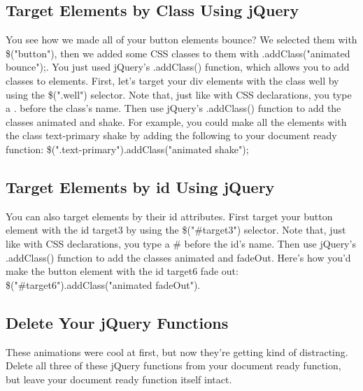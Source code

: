 \documentclass{article}%
\begin{document}
%
\subsection{Target Elements by Class Using jQuery}%
\label{subsec:TargetElementsbyClassUsingjQuery}%
You see how we made all of your button elements bounce? We selected them with \$("button"), then we added some CSS classes to them with .addClass("animated bounce");.\newline%
You just used jQuery's .addClass() function, which allows you to add classes to elements.\newline%
First, let's target your div elements with the class well by using the \$(".well") selector.\newline%
Note that, just like with CSS declarations, you type a . before the class's name.\newline%
Then use jQuery's .addClass() function to add the classes animated and shake.\newline%
For example, you could make all the elements with the class text{-}primary shake by adding the following to your document ready function:\newline%
\$(".text{-}primary").addClass("animated shake");\newline%

%
\subsection{Target Elements by id Using jQuery}%
\label{subsec:TargetElementsbyidUsingjQuery}%
You can also target elements by their id attributes.\newline%
First target your button element with the id target3 by using the \$("\#target3") selector.\newline%
Note that, just like with CSS declarations, you type a \# before the id's name.\newline%
Then use jQuery's .addClass() function to add the classes animated and fadeOut.\newline%
Here's how you'd make the button element with the id target6 fade out:\newline%
\$("\#target6").addClass("animated fadeOut").\newline%

%
\subsection{Delete Your jQuery Functions}%
\label{subsec:DeleteYourjQueryFunctions}%
These animations were cool at first, but now they're getting kind of distracting.\newline%
Delete all three of these jQuery functions from your document ready function, but leave your document ready function itself intact.\newline%
\end{document}
